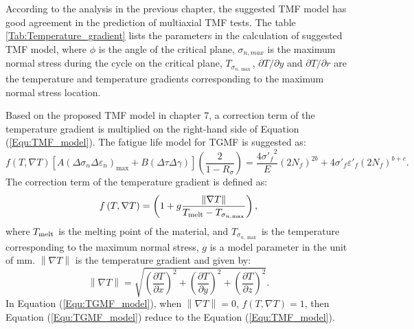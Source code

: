 \noindent
According to the analysis in the previous chapter, the suggested TMF model has good agreement in the prediction of multiaxial TMF tests. The table \ref{Tab:Temperature_gradient} lists the parameters in the calculation of suggested TMF model, where $\phi$ is the angle of the critical plane, $\sigma_{n,max}$ is the maximum normal stress during the cycle on the critical plane, $T_{\sigma_{n,\max}}$, $\partial T/\partial y$ and $\partial T/\partial r$ are the temperature and temperature gradients corresponding to the maximum normal stress location.

Based on the proposed TMF model in chapter 7, a correction term of the temperature gradient is multiplied on the right-hand side of Equation (\ref{Equ:TMF_model}). The fatigue life model for TGMF is suggested as:
\begin{equation}
f\left( {T,\nabla T} \right)\left[ {A{{\left( {\Delta {\sigma _n}\Delta {\varepsilon _n}} \right)}_{\max }} + B\left( {\Delta \tau \Delta \gamma } \right)} \right]\left( {\frac{2}{{1 - {R_\sigma }}}} \right) = \frac{{4{{\sigma '}_f}^2}}{E}{\left( {2{N_f}} \right)^{2b}} + 4{{\sigma '}_f}{{\varepsilon '}_f}{\left( {2{N_f}} \right)^{b + c}}.
\label{Equ:TGMF_model}
\end{equation}
The correction term of the temperature gradient is defined as:
\begin{equation}
f\left( {T,\nabla T} \right) = \left( {1 + g\frac{{\left\| {\nabla T} \right\|}}{{{T_{{\rm{melt}}}} - {T_{{\sigma _{n,\max }}}}}}} \right),
\end{equation}
where ${T_{{\rm{melt}}}}$ is the melting point of the material, and ${T_{{\sigma _{n,\max }}}}$ is the temperature corresponding to the maximum normal stress, $g$ is a model parameter in the unit of mm. ${\left\| {\nabla T} \right\|}$ is the temperature gradient and given by:
\begin{equation}
\left\| {\nabla T} \right\| = \sqrt {{{\left( {\frac{{\partial T}}{{\partial x}}} \right)}^2} + {{\left( {\frac{{\partial T}}{{\partial y}}} \right)}^2} + {{\left( {\frac{{\partial T}}{{\partial z}}} \right)}^2}}.
\end{equation}
In Equation (\ref{Equ:TGMF_model}), when $\left\| {\nabla T} \right\|=0$, $f\left( {T,\nabla T} \right)=1$, then Equation (\ref{Equ:TGMF_model}) reduce to the Equation (\ref{Equ:TMF_model}).

